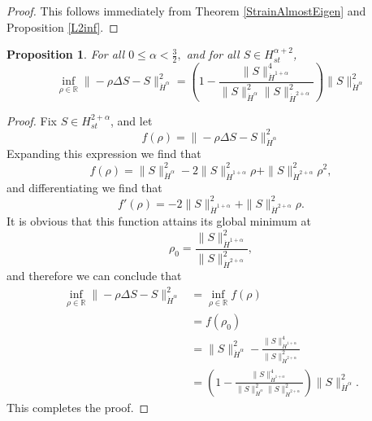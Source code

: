 \documentclass[11pt]{article}
\theoremstyle{plain}
\newtheorem{proposition}[theorem]{Proposition}
\theoremstyle{remark}
\numberwithin{equation}{section}
\begin{document}
\begin{proof}
This follows immediately from Theorem \ref{StrainAlmostEigen}
and Proposition \ref{L2inf}.
\end{proof}




\begin{proposition} \label{HilbertInf}
For all $0\leq\alpha <\frac{3}{2},$
and for all $S\in H^{\alpha+2}_{st}$,
\begin{equation}
    \inf_{\rho\in\mathbb{R}}
    \|-\rho\Delta S-S\|_{\dot{H}^\alpha}^2
    =\left(1-\frac{\|S\|_{\dot{H}^{1+\alpha}}^4}
    {\|S\|_{\dot{H}^\alpha}^2
    \|S\|_{\dot{H}^{2+\alpha}}^2}\right)
    \|S\|_{\dot{H}^\alpha}^2
\end{equation}
\end{proposition}


\begin{proof}
Fix $S\in H^{2+\alpha}_{st}$, and let
\begin{equation}
    f(\rho)=\|-\rho\Delta S-S\|_{\dot{H}^\alpha}^2
\end{equation}
Expanding this expression we find that
\begin{equation}
    f(\rho)=\|S\|_{\dot{H}^\alpha}^2
    -2\|S\|_{\dot{H}^{1+\alpha}}^2 \rho
    +\|S\|_{\dot{H}^{2+\alpha}}^2 \rho^2,
\end{equation}
and differentiating we find that
\begin{equation}
    f'(\rho)=-2\|S\|_{\dot{H}^{1+\alpha}}^2
    +\|S\|_{\dot{H}^{2+\alpha}}^2 \rho.
\end{equation}
It is obvious that this function attains its global minimum at
\begin{equation}
    \rho_0=\frac{\|S\|_{\dot{H}^{1+\alpha}}^2}
    {\|S\|_{\dot{H}^{2+\alpha}}^2},
\end{equation}
and therefore we can conclude that
\begin{align}
    \inf_{\rho\in\mathbb{R}}
    \|-\rho\Delta S-S\|_{\dot{H}^\alpha}^2
    &=
    \inf_{\rho\in\mathbb{R}} f(\rho) \\
    &=
    f(\rho_0) \\
    &=
    \|S\|_{\dot{H}^\alpha}^2-
    \frac{\|S\|_{\dot{H}^{1+\alpha}}^4}
    {\|S\|_{\dot{H}^{2+\alpha}}^2} \\
    &=
    \left(1-\frac{\|S\|_{\dot{H}^{1+\alpha}}^4}
    {\|S\|_{\dot{H}^\alpha}^2
    \| S\|_{\dot{H}^{2+\alpha}}^2}\right)
    \|S\|_{\dot{H}^\alpha}^2.
\end{align}
This completes the proof.
\end{proof}
\end{document}

